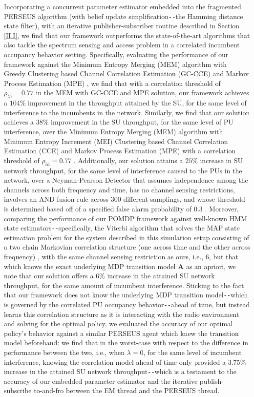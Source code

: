 \documentclass[12pt, draftcls, onecolumn]{IEEEtran}
\begin{document}
Incorporating a concurrent parameter estimator embedded into the fragmented PERSEUS algorithm (with belief update simplification\texttt{-{}-}the Hamming distance state filter), with an iterative publisher-subscriber routine described in Section \ref{II.I}, we find that our framework outperforms the state-of-the-art algorithms that also tackle the spectrum sensing and access problem in a correlated incumbent occupancy behavior setting. Specifically, evaluating the performance of our framework against the Minimum Entropy Merging (MEM) algorithm with Greedy Clustering based Channel Correlation Estimation (GC-CCE) and Markov Process Estimation (MPE) \cite{WCL:7}, we find that with a correlation threshold of $\rho_{th}{=}0.77$ in the MEM with GC-CCE and MPE solution, our framework achieves a $104$\% improvement in the throughput attained by the SU, for the same level of interference to the incumbents in the network. Similarly, we find that our solution achieves a $38$\% improvement in the SU throughput, for the same level of PU interference, over the Minimum Entropy Merging (MEM) algorithm with Minimum Entropy Increment (MEI) Clustering based Channel Correlation Estimation (CCE) and Markov Process Estimation (MPE) with a correlation threshold of $\rho_{th}{=}0.77$ \cite{WCL:7}. Additionally, our solution attains a $25$\% increase in SU network throughput, for the same level of interference caused to the PUs in the network, over a Neyman-Pearson Detector that assumes independence among the channels across both frequency and time, has no channel sensing restrictions, involves an AND fusion rule across 300 different samplings, and whose threshold is determined based off of a specified false alarm probability of $0.3$ \cite{WCL:paper, WCL:11}. Moreover, comparing the performance of our POMDP framework against well-known HMM state estimators\texttt{-{}-}specifically, the Viterbi algorithm that solves the MAP state estimation problem for the system described in this simulation setup consisting of a two chain Markovian correlation structure (one across time and the other across frequency) \cite{WCL:6}, with the same channel sensing restriction as ours, i.e., $6$, but that which knows the exact underlying MDP transition model $\mathbf{A}$ as an apriori, we note that our solution offers a $6$\% increase in the attained SU network throughput, for the same amount of incumbent interference. Sticking to the fact that our framework does not know the underlying MDP transition model\texttt{-{}-}which is governed by the correlated PU occupancy behavior\texttt{-{}-}ahead of time, but instead learns this correlation structure as it is interacting with the radio environment and solving for the optimal policy, we evaluated the accuracy of our optimal policy's behavior against a similar PERSEUS agent which knew the transition model beforehand: we find that in the worst-case with respect to the difference in performance between the two, i.e., when $\lambda{=}0$, for the same level of incumbent interference, knowing the correlation model ahead of time only provided a $3.75$\% increase in the attained SU network throughput\texttt{-{}-}which is a testament to the accuracy of our embedded parameter estimator and the iterative publish-subscribe to-and-fro between the EM thread and the PERSEUS thread. 
\end{document}

